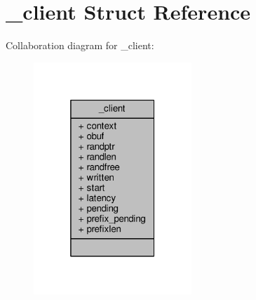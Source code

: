 \hypertarget{struct__client}{}\section{\+\_\+client Struct Reference}
\label{struct__client}


Collaboration diagram for \+\_\+client\+:\nopagebreak
\begin{figure}[H]
\begin{center}
\leavevmode
\includegraphics[width=169pt]{struct__client__coll__graph}
\end{center}
\end{figure}
